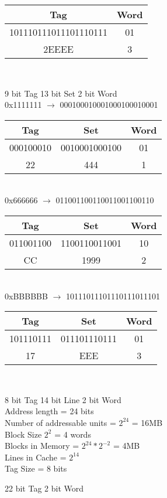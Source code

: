 \documentclass[12pt,largemargins]{homework}
\begin{document}
\begin{alphaparts}
\begin{tabular}{|c|c|}
\hline
Tag&Word\\
\hline
101110111011101110111&01\\
\hline
2EEEE&3\\
\hline
\end{tabular}\\
\item
9 bit Tag 13 bit Set 2 bit Word\\
0x1111111 $\rightarrow$ 000100010001000100010001\\
\begin{tabular}{|c|c|c|}
\hline
Tag&Set&Word\\
\hline
000100010&0010001000100&01\\
\hline
22&444&1\\
\hline
\end{tabular}\\
0x666666 $\rightarrow$ 011001100110011001100110\\
\begin{tabular}{|c|c|c|}
\hline
Tag&Set&Word\\
\hline
011001100&1100110011001&10\\
\hline
CC&1999&2\\
\hline
\end{tabular}\\
0xBBBBBB $\rightarrow$ 10111011101110111011101\\
\begin{tabular}{|c|c|c|}
\hline
Tag&Set&Word\\
\hline
101110111&011101110111&01\\
\hline
17&EEE&3\\
\hline
\end{tabular}\\
\end{alphaparts}
\begin{alphaparts}
\item
8 bit Tag 14 bit Line 2 bit Word\\
Address length = 24 bits\\
Number of addressable units = $2^24$ = 16MB\\
Block Size $2^2$ = 4 words\\
Blocks in Memory = $2^24*2^{-2}$ = 4MB\\
Lines in Cache = $2^14$\\
Tag Size = 8 bits\\
\item
22 bit Tag 2 bit Word\\

\end{alphaparts}
\end{document}
